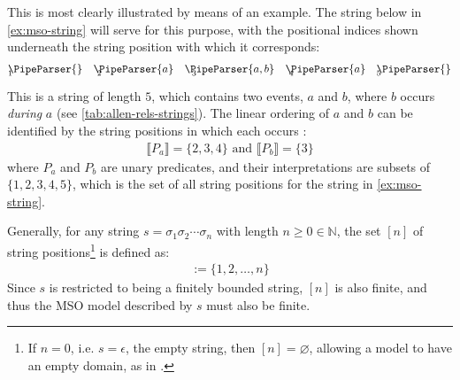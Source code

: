 \documentclass[a4paper,12pt,leqno]{article}
\newcommand{\vph}[1]{\vphantom{#1}}
\newcommand{\ebox}[1]{\fbox{$\vph{'(),}#1$}}
\renewcommand{\emptyset}{\varnothing}
\newcommand{\EventString}[1]{%
	\renewcommand*{\do}[1]{\ebox{##1}}%
	\PipeParser{#1}%
}
\begin{document}
This is most clearly illustrated by means of an example. The string below in \cref{ex:mso-string} will serve for this purpose, with the positional indices shown underneath the string position with which it corresponds:
\begin{alignat}{5}\label{ex:mso-string}
	&\EventString{{}} && \EventString{a} && \EventString{a,b} && \EventString{a} && \EventString{{}}\\[-1.2em]
	&{\scriptstyle 1} && {\scriptstyle ~2} && {\scriptstyle ~~3} && {\scriptstyle ~4} && {\scriptstyle 5}\notag
\end{alignat}
This is a string of length $5$, which contains two events, $a$ and $b$, where $b$ occurs \textit{during} $a$ (see \cref{tab:allen-rels-strings}). The linear ordering of $a$ and $b$ can be identified by the string positions in which each occurs \citep{fernando2016regular,Fernando2018}:
\begin{align}
	\llbracket P_a \rrbracket = \{2,3,4\} \text{ and } \llbracket P_b \rrbracket = \{3\}
\end{align}
where $P_a$ and $P_b$ are unary predicates, and their interpretations are subsets of $\{1,2,3,4,5\}$, which is the set of all string positions for the string in \cref{ex:mso-string}.

Generally, for any string $s = \sigma_1\sigma_2\cdots\sigma_n$ with length $n \ge 0 \in \mathbb{N}$, the set $[n]$ of string positions\footnote{If $n = 0$, i.e. $s = \epsilon$, the empty string, then $[n] = \emptyset$, allowing a model to have an empty domain, as in \citet{Libkin2004}.} is defined as:
\begin{align}
	[n] := \{1,2,\ldots,n\}
\end{align}
Since $s$ is restricted to being a finitely bounded string, $[n]$ is also finite, and thus the MSO model described by $s$ must also be finite.
\end{document}
